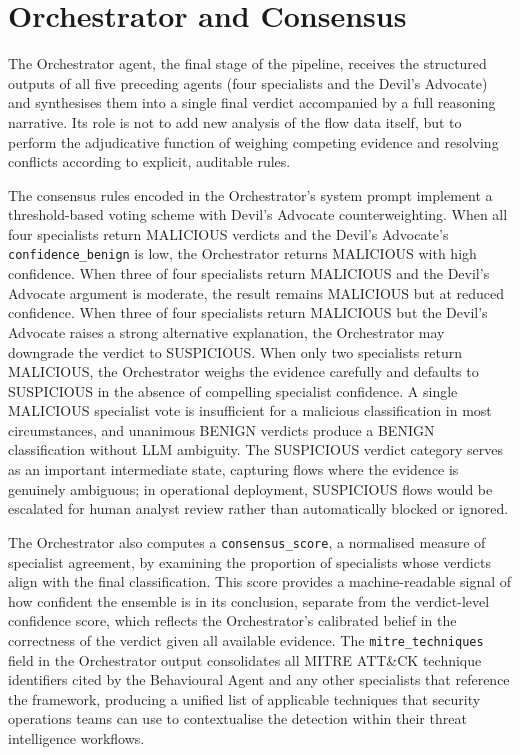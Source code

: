 \section{Orchestrator and Consensus}
\label{sec:orchestrator-consensus}

The Orchestrator agent, the final stage of the pipeline, receives the structured outputs of all five preceding agents (four specialists and the Devil's Advocate) and synthesises them into a single final verdict accompanied by a full reasoning narrative. Its role is not to add new analysis of the flow data itself, but to perform the adjudicative function of weighing competing evidence and resolving conflicts according to explicit, auditable rules.

The consensus rules encoded in the Orchestrator's system prompt implement a threshold-based voting scheme with Devil's Advocate counterweighting. When all four specialists return MALICIOUS verdicts and the Devil's Advocate's \texttt{confidence\_benign} is low, the Orchestrator returns MALICIOUS with high confidence. When three of four specialists return MALICIOUS and the Devil's Advocate argument is moderate, the result remains MALICIOUS but at reduced confidence. When three of four specialists return MALICIOUS but the Devil's Advocate raises a strong alternative explanation, the Orchestrator may downgrade the verdict to SUSPICIOUS. When only two specialists return MALICIOUS, the Orchestrator weighs the evidence carefully and defaults to SUSPICIOUS in the absence of compelling specialist confidence. A single MALICIOUS specialist vote is insufficient for a malicious classification in most circumstances, and unanimous BENIGN verdicts produce a BENIGN classification without LLM ambiguity. The SUSPICIOUS verdict category serves as an important intermediate state, capturing flows where the evidence is genuinely ambiguous; in operational deployment, SUSPICIOUS flows would be escalated for human analyst review rather than automatically blocked or ignored.

The Orchestrator also computes a \texttt{consensus\_score}, a normalised measure of specialist agreement, by examining the proportion of specialists whose verdicts align with the final classification. This score provides a machine-readable signal of how confident the ensemble is in its conclusion, separate from the verdict-level confidence score, which reflects the Orchestrator's calibrated belief in the correctness of the verdict given all available evidence. The \texttt{mitre\_techniques} field in the Orchestrator output consolidates all MITRE ATT\&CK technique identifiers cited by the Behavioural Agent and any other specialists that reference the framework, producing a unified list of applicable techniques that security operations teams can use to contextualise the detection within their threat intelligence workflows.

